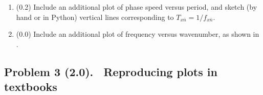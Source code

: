 \documentclass[11pt,titlepage,fleqn]{article}
\newcommand{\cutoff}[1]{{#1}_{x\bar{n}}}
\begin{document}
\begin{enumerate}
\begin{enumerate}
\item (0.2) Include an additional plot of phase speed versus period, and sketch (by hand or in Python) vertical lines corresponding to $\cutoff{T} = 1/\cutoff{f}$.

\item (0.0) Include an additional plot of frequency versus wavenumber, as shown in .
\end{enumerate}

\end{enumerate}


\subsection*{Problem 3 (2.0). \ptag\ Reproducing plots in textbooks}
\end{document}
